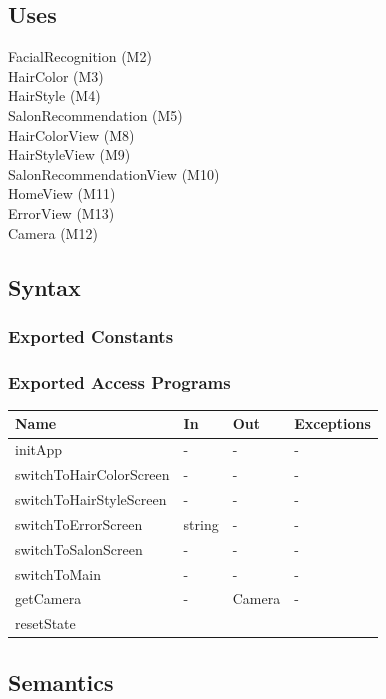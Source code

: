 \documentclass[12pt, titlepage]{article}
\begin{document}
\subsection{Uses}
FacialRecognition (M2) \\
HairColor (M3) \\
HairStyle (M4) \\
SalonRecommendation (M5) \\
HairColorView (M8) \\
HairStyleView (M9) \\
SalonRecommendationView (M10) \\
HomeView (M11) \\
ErrorView (M13) \\
Camera (M12) \\

\subsection{Syntax}

\subsubsection{Exported Constants}

\subsubsection{Exported Access Programs}

\begin{center}
\begin{tabular}{p{5cm} p{3cm} p{3cm} p{2cm}}
\hline
\textbf{Name} & \textbf{In} & \textbf{Out} & \textbf{Exceptions} \\
\hline
initApp & - & - & - \\
switchToHairColorScreen & - & - & - \\
switchToHairStyleScreen & - & - & - \\
switchToErrorScreen & string & - & - \\
switchToSalonScreen & - & - & - \\
switchToMain & - & - & - \\
getCamera & - & Camera & - \\
resetState & & & \\
\hline
\end{tabular}
\end{center}

\subsection{Semantics}
\end{document}
